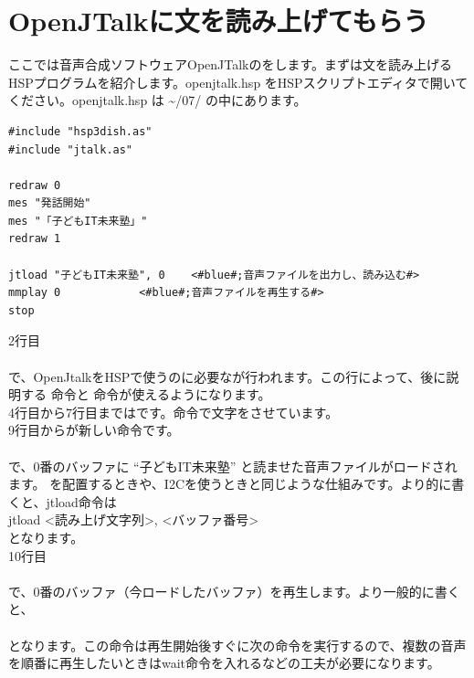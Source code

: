 \newpage
\section{OpenJTalkに文を読み上げてもらう}
ここでは音声合成ソフトウェアOpenJTalkのをします。まずは文を読み上げるHSPプログラムを紹介します。openjtalk.hsp をHSPスクリプトエディタで開いてください。openjtalk.hsp は  \textasciitilde /07/ の中にあります。\\

\begin{lstlisting}[caption=openjtalk.hsp,label=openjtalk.hsp]
#include "hsp3dish.as"
#include "jtalk.as"

redraw 0
mes "発話開始"
mes "「子どもIT未来塾」"
redraw 1

jtload "子どもIT未来塾", 0	<#blue#;音声ファイルを出力し、読み込む#>
mmplay 0			<#blue#;音声ファイルを再生する#>
stop
\end{lstlisting}

\noindent
2行目\\
\\
で、OpenJtalkをHSPで使うのに必要なが行われます。この行によって、後に説明する  命令と  命令が使えるようになります。\\
4行目から7行目まではです。命令で文字をさせています。\\
9行目からが新しい命令です。\\
\\
で、0番のバッファに “子どもIT未来塾” と読ませた音声ファイルがロードされます。 を配置するときや、I2Cを使うときと同じような仕組みです。より的に書くと、jtload命令は\\
jtload <読み上げ文字列>, <バッファ番号>\\
となります。\\
10行目\\
\\
で、0番のバッファ（今ロードしたバッファ）を再生します。より一般的に書くと、\\
\\
となります。この命令は再生開始後すぐに次の命令を実行するので、複数の音声を順番に再生したいときはwait命令を入れるなどの工夫が必要になります。\\

\begin{tcolorbox}[title=\useOmetoi]
\begin{enumerate}
\end{enumerate}
\end{tcolorbox}
